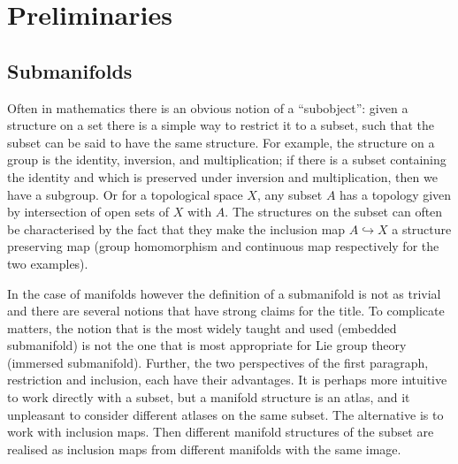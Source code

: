 
\section{Preliminaries}

\subsection{Submanifolds}

Often in mathematics there is an obvious notion of a ``subobject'': given a structure on a set there is a simple way to restrict it to a subset, such that the subset can be said to have the same structure.
For example, the structure on a group is the identity, inversion, and multiplication; if there is a subset containing the identity and which is preserved under inversion and multiplication, then we have a subgroup.
Or for a topological space $X$, any subset $A$ has a topology given by intersection of open sets of $X$ with $A$.
The structures on the subset can often be characterised by the fact that they make the inclusion map $A \hookrightarrow X$ a structure preserving map (group homomorphism and continuous map respectively for the two examples).

In the case of manifolds however the definition of a submanifold is not as trivial and there are several notions that have strong claims for the title.
To complicate matters, the notion that is the most widely taught and used (embedded submanifold) is not the one that is most appropriate for Lie group theory (immersed submanifold).
Further, the two perspectives of the first paragraph, restriction and inclusion, each have their advantages.
It is perhaps more intuitive to work directly with a subset, but a manifold structure is an atlas, and it unpleasant to consider different atlases on the same subset.
The alternative is to work with inclusion maps.
Then different manifold structures of the subset are realised as inclusion maps from different manifolds with the same image.

